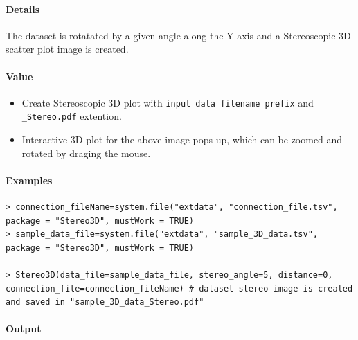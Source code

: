 \documentclass[]{article}
\providecommand{\tightlist}{%
  \setlength{\itemsep}{0pt}\setlength{\parskip}{0pt}}
\let\oldparagraph\paragraph
\renewcommand{\paragraph}[1]{\oldparagraph{#1}\mbox{}}
\begin{document}
\paragraph{\texorpdfstring{\textbf{Details}}{Details}}\label{details}

The dataset is rotatated by a given angle along the Y-axis and a
Stereoscopic 3D scatter plot image is created.

\paragraph{\texorpdfstring{\textbf{Value}}{Value}}\label{value}

\begin{itemize}
\tightlist
\item
  Create Stereoscopic 3D plot with
  \texttt{input\ data\ filename\ prefix} and \texttt{\_Stereo.pdf}
  extention.
\item
  Interactive 3D plot for the above image pops up, which can be zoomed
  and rotated by draging the mouse.
\end{itemize}

\paragraph{\texorpdfstring{\textbf{Examples}}{Examples}}\label{examples}

\begin{verbatim}
> connection_fileName=system.file("extdata", "connection_file.tsv",
package = "Stereo3D", mustWork = TRUE)
> sample_data_file=system.file("extdata", "sample_3D_data.tsv",
package = "Stereo3D", mustWork = TRUE)

> Stereo3D(data_file=sample_data_file, stereo_angle=5, distance=0,
connection_file=connection_fileName) # dataset stereo image is created
and saved in "sample_3D_data_Stereo.pdf"
\end{verbatim}

\paragraph{Output}\label{output}
\end{document}
